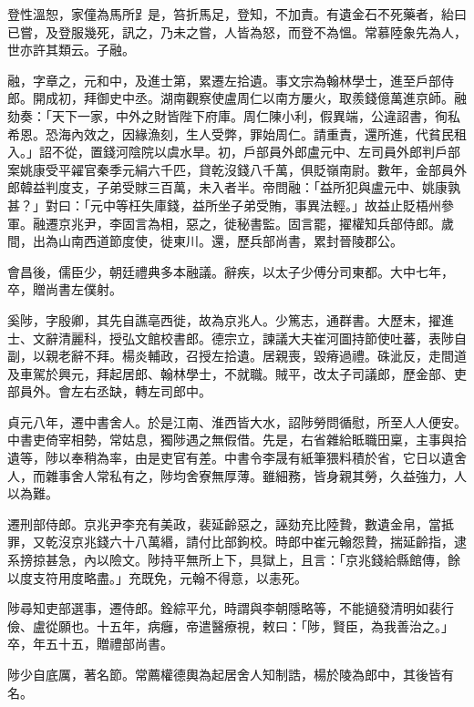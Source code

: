 \begin{pinyinscope}
 登性溫恕，家僮為馬所𧾷是，笞折馬足，登知，不加責。有遺金石不死藥者，紿曰已嘗，及登服幾死，訊之，乃未之嘗，人皆為怒，而登不為慍。常慕陸象先為人，世亦許其類云。子融。



 融，字章之，元和中，及進士第，累遷左拾遺。事文宗為翰林學士，進至戶部侍郎。開成初，拜御史中丞。湖南觀察使盧周仁以南方屢火，取羨錢億萬進京師。融劾奏：「天下一家，中外之財皆陛下府庫。周仁陳小利，假異端，公違詔書，徇私希恩。恐海內效之，因緣漁刻，生人受弊，罪始周仁。請重責，還所進，代貧民租入。」詔不從，置錢河陰院以虞水旱。初，戶部員外郎盧元中、左司員外郎判戶部案姚康受平糴官秦季元絹六千匹，貸乾沒錢八千萬，俱貶嶺南尉。數年，金部員外郎韓益判度支，子弟受賕三百萬，未入者半。帝問融：「益所犯與盧元中、姚康孰甚？」對曰：「元中等枉失庫錢，益所坐子弟受賄，事異法輕。」故益止貶梧州參軍。融遷京兆尹，李固言為相，惡之，徙秘書監。固言罷，擢權知兵部侍郎。歲間，出為山南西道節度使，徙東川。還，歷兵部尚書，累封晉陵郡公。



 會昌後，儒臣少，朝廷禮典多本融議。辭疾，以太子少傅分司東都。大中七年，卒，贈尚書左僕射。



 奚陟，字殷卿，其先自譙亳西徙，故為京兆人。少篤志，通群書。大歷末，擢進士、文辭清麗科，授弘文館校書郎。德宗立，諫議大夫崔河圖持節使吐蕃，表陟自副，以親老辭不拜。楊炎輔政，召授左拾遺。居親喪，毀瘠過禮。硃泚反，走間道及車駕於興元，拜起居郎、翰林學士，不就職。賊平，改太子司議郎，歷金部、吏部員外。會左右丞缺，轉左司郎中。



 貞元八年，遷中書舍人。於是江南、淮西皆大水，詔陟勞問循慰，所至人人便安。中書吏倚宰相勢，常姑息，獨陟遇之無假借。先是，右省雜給眡職田稟，主事與拾遺等，陟以奉稍為率，由是吏官有差。中書令李晟有紙筆猥料積於省，它日以遺舍人，而雜事舍人常私有之，陟均舍寮無厚薄。雖細務，皆身親其勞，久益強力，人以為難。



 遷刑部侍郎。京兆尹李充有美政，裴延齡惡之，誣劾充比陸贄，數遺金帛，當抵罪，又乾沒京兆錢六十八萬緡，請付比部鉤校。時郎中崔元翰怨贄，揣延齡指，逮系搒掠甚急，內以險文。陟持平無所上下，具獄上，且言：「京兆錢給縣館傳，餘以度支符用度略盡。」充既免，元翰不得意，以恚死。



 陟尋知吏部選事，遷侍郎。銓綜平允，時謂與李朝隱略等，不能擿發清明如裴行儉、盧從願也。十五年，病癰，帝遣醫療視，敕曰：「陟，賢臣，為我善治之。」卒，年五十五，贈禮部尚書。



 陟少自底厲，著名節。常薦權德輿為起居舍人知制誥，楊於陵為郎中，其後皆有名。




\end{pinyinscope}
